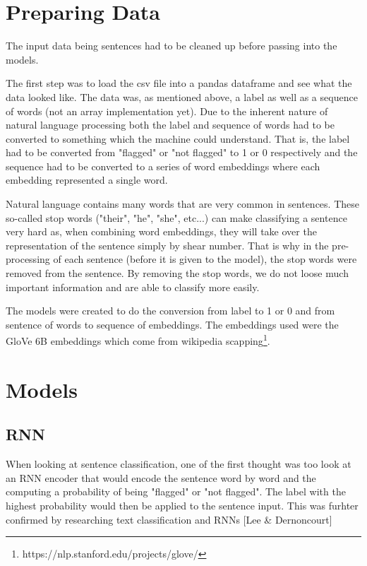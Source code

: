 \documentclass[twoside,twocolumn]{article}
\begin{document}
\section{Preparing Data}
The input data being sentences had to be cleaned up before passing into the models.

The first step was to load the csv file into a pandas dataframe and see what the data looked like.
The data was, as mentioned above, a label as well as a sequence of words (not an array implementation yet).
Due to the inherent nature of natural language processing both the label and sequence of words had to
be converted to something which the machine could understand. That is, the label had to be converted from 
"flagged" or "not flagged" to 1 or 0 respectively and the sequence had to be converted to a series of word
embeddings where each embedding represented a single word.

Natural language contains many words that are very common in sentences. These so-called stop words
 ("their", "he", "she", etc...) can make classifying a sentence very hard as, when combining word
 embeddings, they will take over the representation of the sentence simply by shear number. That is 
 why in the pre-processing of each sentence (before it is given to the model), the stop words were removed
 from the sentence. By removing the stop words, we do not loose much important information and
 are able to classify more easily.

The models were created to do the conversion from label to 1 or 0 and from sentence of words to sequence of embeddings.
The embeddings used were the GloVe 6B embeddings which come from wikipedia scapping\footnote{https://nlp.stanford.edu/projects/glove/}.


\section{Models}

\subsection{RNN}

When looking at sentence classification, one of the first thought was too look at an RNN encoder
that would encode the sentence word by word and the computing a probability of being "flagged"
or "not flagged". The label with the highest probability would then be applied to the sentence input.
This was furhter confirmed by researching text classification and RNNs [Lee & Dernoncourt]
\end{document}
